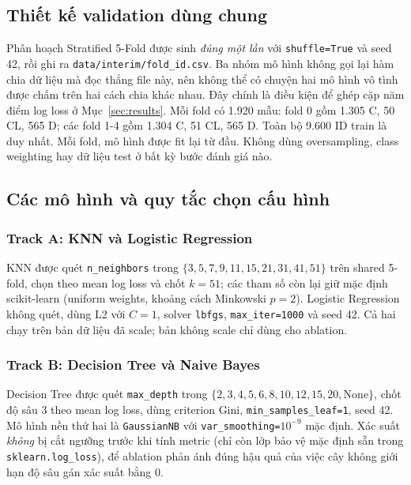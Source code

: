 \documentclass[12pt]{template/ai_conquer2026}
\begin{document}
\subsection{Thiết kế validation dùng chung}

Phân hoạch Stratified 5-Fold được sinh \emph{đúng một lần} với
\texttt{shuffle=True} và seed 42, rồi ghi ra
\texttt{data/\allowbreak interim/\allowbreak fold\_id.csv}. Ba nhóm mô hình không
gọi lại hàm chia dữ liệu mà đọc thẳng file này, nên không thể có chuyện hai mô
hình vô tình được chấm trên hai cách chia khác nhau. Đây chính là điều kiện để
ghép cặp năm điểm log loss ở Mục~\ref{sec:results}. Mỗi fold có 1.920 mẫu: fold 0 gồm
1.305 C, 50 CL, 565 D; các fold 1-4 gồm 1.304 C, 51 CL, 565 D. Toàn bộ 9.600 ID
train là duy nhất. Mỗi fold, mô hình được fit lại từ đầu. Không dùng oversampling,
class weighting hay dữ liệu test ở bất kỳ bước đánh giá nào.

\subsection{Các mô hình và quy tắc chọn cấu hình}

\subsubsection{Track A: KNN và Logistic Regression}

KNN được quét \texttt{n\_neighbors} trong $\{3,5,7,9,11,15,21,31,41,51\}$ trên
shared 5-fold, chọn theo mean log loss và chốt $k=51$; các tham số còn lại giữ mặc
định scikit-learn (uniform weights, khoảng cách Minkowski $p=2$). Logistic
Regression không quét, dùng L2 với $C=1$, solver \texttt{lbfgs},
\texttt{max\_iter=1000} và seed 42.
Cả hai chạy trên bản dữ liệu đã scale; bản không scale chỉ dùng cho ablation.

\subsubsection{Track B: Decision Tree và Naive Bayes}

Decision Tree được quét \texttt{max\_depth} trong
$\{2,3,4,5,6,8,10,12,15,20,\mathrm{None}\}$, chốt độ sâu 3 theo mean log loss, dùng
criterion Gini, \texttt{min\_samples\_leaf=1}, seed 42. Mô hình nền thứ hai là
\texttt{GaussianNB} với \texttt{var\_smoothing=$10^{-9}$} mặc định. Xác suất
\emph{không} bị cắt ngưỡng trước khi tính metric (chỉ còn lớp bảo vệ mặc định sẵn
trong \texttt{sklearn.log\_loss}), để ablation phản ánh đúng hậu quả của việc cây
không giới hạn độ sâu gán xác suất bằng 0.
\end{document}
